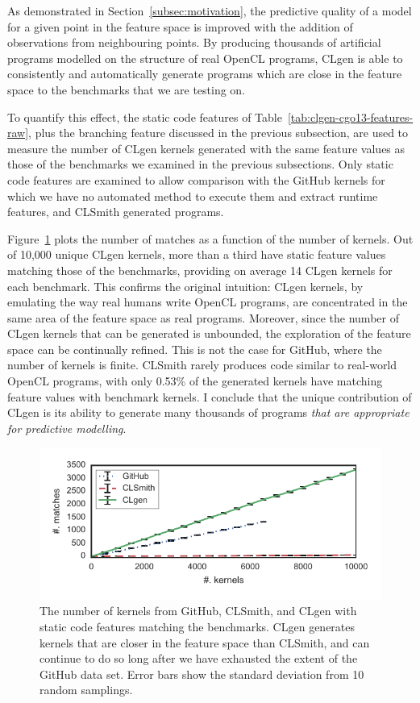 As demonstrated in Section~\ref{subsec:motivation}, the predictive quality of a model for a given point in the feature space is improved with the addition of observations from neighbouring points. By producing thousands of artificial programs modelled on the structure of real OpenCL programs, CLgen is able to consistently and automatically generate programs which are close in the feature space to the benchmarks that we are testing on.

To quantify this effect, the static code features of Table~\ref{tab:clgen-cgo13-features-raw}, plus the branching feature discussed in the previous subsection, are used to measure the number of CLgen kernels generated with the same feature values as those of the benchmarks we examined in the previous subsections. Only static code features are examined to allow comparison with the GitHub kernels for which we have no automated method to execute them and extract runtime features, and CLSmith generated programs.

Figure~\ref{fig:nn} plots the number of matches as a function of the number of kernels. Out of 10,000 unique CLgen kernels, more than a third have static feature values matching those of the benchmarks, providing on average 14 CLgen kernels for each benchmark. This confirms the original intuition: CLgen kernels, by emulating the way real humans write OpenCL programs, are concentrated in the same area of the feature space as real programs. Moreover, since the number of CLgen kernels that can be generated is unbounded, the exploration of the feature space can be continually refined. This is not the case for GitHub, where the number of kernels is finite. CLSmith rarely produces code similar to real-world OpenCL programs, with only 0.53\% of the generated kernels have matching feature values with benchmark kernels. I conclude that the unique contribution of CLgen is its ability to generate many thousands of programs \textit{that are appropriate for predictive modelling}.

\begin{figure}
  \includegraphics[width=\columnwidth]{img/closeness} %
  \caption[Number of kernels matching benchmark features]{%
    The number of kernels from GitHub, CLSmith, and CLgen with static code features matching the benchmarks. CLgen generates kernels that are closer in the feature space than CLSmith, and can continue to do so long after we have exhausted the extent of the GitHub data set. Error bars show the standard deviation from 10 random samplings.%
  }%
  \label{fig:nn}
\end{figure}
